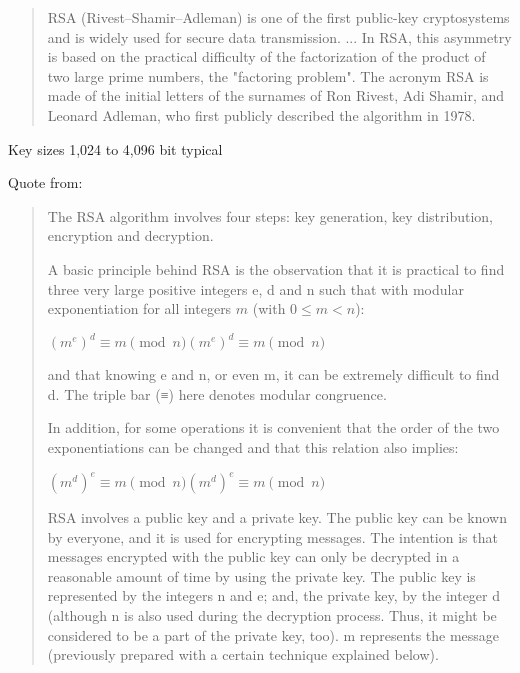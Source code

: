 \documentclass[Screen16to9,17pt]{foils}
\begin{document}

\begin{quote}
RSA (Rivest–Shamir–Adleman) is one of the first public-key cryptosystems and is widely used for secure data transmission. ...
In RSA, this asymmetry is based on the practical difficulty of the factorization of the product of two large prime numbers, the "factoring problem". The acronym RSA is made of the initial letters of the surnames of Ron Rivest, Adi Shamir, and Leonard Adleman, who first publicly described the algorithm in 1978.
\end{quote}

\begin{list2}
\item Key sizes	1,024 to 4,096 bit typical
\item  Quote from: 
\end{list2}



\begin{quote}\small
The RSA algorithm involves four steps: key generation, key distribution, encryption and decryption.

A basic principle behind RSA is the observation that it is practical to find three very large positive integers e, d and n such that with modular exponentiation for all integers $m$ (with $0 ≤ m < n$):

${\displaystyle (m^{e})^{d}\equiv m{\pmod {n}}} {\displaystyle (m^{e})^{d}\equiv m{\pmod {n}}}$

and that knowing e and n, or even m, it can be extremely difficult to find d. The triple bar (≡) here denotes modular congruence.

In addition, for some operations it is convenient that the order of the two exponentiations can be changed and that this relation also implies:

${\displaystyle (m^{d})^{e}\equiv m{\pmod {n}}} {\displaystyle (m^{d})^{e}\equiv m{\pmod {n}}}$

RSA involves a public key and a private key. The public key can be known by everyone, and it is used for encrypting messages. The intention is that messages encrypted with the public key can only be decrypted in a reasonable amount of time by using the private key. The public key is represented by the integers n and e; and, the private key, by the integer d (although n is also used during the decryption process. Thus, it might be considered to be a part of the private key, too). m represents the message (previously prepared with a certain technique explained below).
\end{quote}
\end{document}

